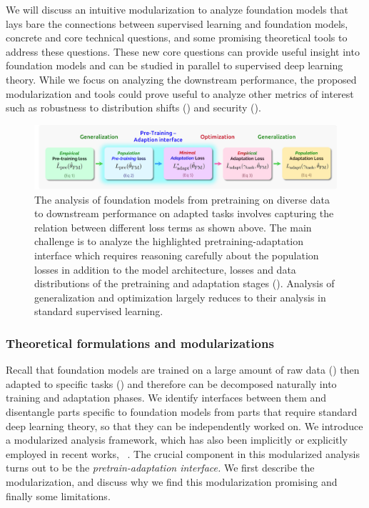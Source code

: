 We will discuss an intuitive modularization to analyze foundation models that lays bare the connections between supervised learning and foundation models, concrete and core technical questions, and some promising theoretical tools to address these questions. These new core questions can provide useful insight into foundation models and can be studied in parallel to supervised deep learning theory. While we focus on analyzing the downstream performance, the proposed modularization and tools could prove useful to analyze other metrics of interest such as robustness to distribution shifts () and security ().

\begin{figure}[!ht]
\centering
\includegraphics[width=\linewidth]{technology/figures/Theory.png}
\caption{\label{fig:theory} The analysis of foundation models from pretraining on diverse data to downstream performance on adapted tasks involves capturing the relation between different loss terms as shown above. The main challenge is to analyze the highlighted pretraining-adaptation interface which requires reasoning carefully about the population losses in addition to the model architecture, losses and data distributions of the pretraining and adaptation stages (). Analysis of generalization and optimization largely reduces to their analysis in standard supervised learning.}
\end{figure}

\subsubsection{Theoretical formulations and modularizations}
\label{sec:theory-modularizations}
Recall that foundation models are trained on a large amount of raw data ()  then adapted to specific tasks () and therefore can be decomposed naturally into training and adaptation phases. We identify interfaces between them and disentangle parts specific to foundation models from parts that require standard deep learning theory, so that they can be independently worked on. We introduce a modularized analysis framework, which has also been implicitly or explicitly employed in recent works, \eg~\citet{arora2019theoretical,haochen2021spectral,wei2020theoretical,tripuraneni2020theory}. The crucial component in this modularized analysis turns out to be the \emph{pretrain-adaptation interface.} We first describe the modularization, and discuss why we find this modularization promising and finally some limitations. 


